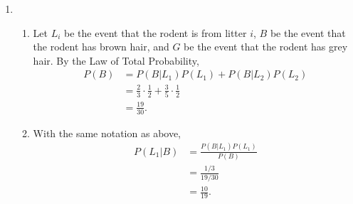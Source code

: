 \documentclass{article}
\begin{document}
\begin{enumerate}
    \item \begin{enumerate}
        \item Let $L_i$ be the event that the rodent is from litter $i$, $B$ be the event 
        that the rodent has brown hair, and $G$ be the event that the rodent has grey hair. 
        By the Law of Total Probability, 
        \begin{align*}
            P(B) 
            &= P(B|L_1)P(L_1) + P(B|L_2)P(L_2) \\
            &= \frac{2}{3} \cdot \frac{1}{2} + \frac{3}{5} \cdot \frac{1}{2} \\
            &= \frac{19}{30}.
        \end{align*}

        \item With the same notation as above, 
        \begin{align*}
            P(L_1|B) 
            &= \frac{P(B|L_1)P(L_1)}{P(B)} \\
            &= \frac{1/3}{19/30} \\
            &= \frac{10}{19}.
        \end{align*}
    \end{enumerate}
\end{enumerate}
\end{document}
